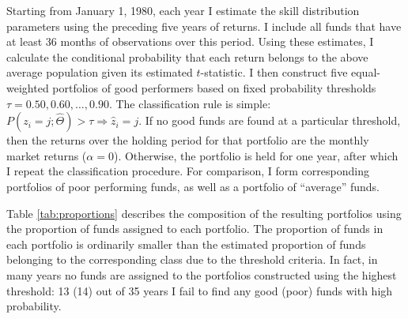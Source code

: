 		Starting from January 1, 1980, each year I estimate the skill distribution parameters using the preceding five years of returns. I include all funds that have at least 36 months of observations over this period. Using these estimates, I calculate the conditional probability that each return belongs to the above average population given its estimated $t$-statistic. I then construct five equal-weighted portfolios of good performers based on fixed probability thresholds $\tau = 0.50, 0.60, \dots, 0.90$.  The classification rule is simple: $P(z_i = j; \hat{\Theta}) > \tau \Rightarrow \hat{z}_i = j$.  If no good funds are found at a particular threshold, then the returns over the holding period for that portfolio are the monthly market returns ($\alpha = 0$).  Otherwise, the portfolio is held for one year, after which I repeat the classification procedure.  For comparison, I form corresponding portfolios of poor performing funds, as well as a portfolio of ``average'' funds.

		Table \ref{tab:proportions} describes the composition of the resulting portfolios using the proportion of funds assigned to each portfolio.  The proportion of funds in each portfolio is ordinarily smaller than the estimated proportion of funds belonging to the corresponding class due to the threshold criteria.  In fact, in many years no funds are assigned to the portfolios constructed using the highest threshold: 13 (14) out of 35 years I fail to find any good (poor) funds with high probability.

